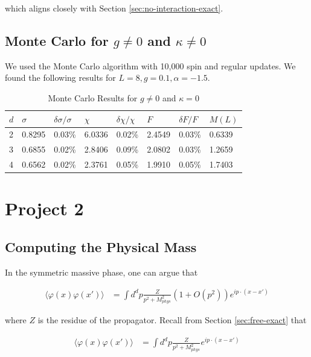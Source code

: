 \documentclass[12]{report}
\newcommand\0{\mathbf{0}}
\newcommand\<{\langle}
\renewcommand\>{\rangle}
\renewcommand\phi{\varphi}
\begin{document}
which aligns closely with Section \ref{sec:no-interaction-exact}.

\section{Monte Carlo for $g\neq0$ and $\kappa \neq 0$}


We used the Monte Carlo algorithm with 10,000 spin and regular updates. We found the following results for $L = 8, g = 0.1, \alpha = -1.5$.

\begin{table}[H]
\centering
\begin{tabular}{|l|l|l|l|l|l|l|l|}
\hline
$d$ & $\sigma$ & $\delta \sigma / \sigma$ & $\chi$ & $\delta \chi / \chi$ & $F$ & $ \delta F / F$ & $M(L)$ \\ \hline
2   & 0.8295 & 0.03\% & 6.0336 & 0.02\%& 2.4549 & 0.03\% & 0.6339 \\
3   & 0.6855 & 0.02\%& 2.8406 & 0.09\% & 2.0802 & 0.03\% & 1.2659  \\
4   & 0.6562 &  0.02\% & 2.3761 & 0.05\% & 1.9910 &  0.05\% & 1.7403 \\ \hline
\end{tabular}
\caption{Monte Carlo Results for $g\neq 0$ and $\kappa = 0$}
\end{table}


\chapter{Project 2}

\section{Computing the Physical Mass}

In the symmetric massive phase, one can argue that 


\begin{align*}
\< \phi(x) \phi(x') \> &= \int d^dp \frac{Z}{p^2 + M^2_{phys}} (1 + O(p^2)) e^{ip \cdot (x-x')}	
\end{align*}

where $Z$ is the residue of the propagator. Recall from Section \ref{sec:free-exact} that

\begin{align*}
\< \phi(x) \phi(x') \> &= \int d^dp \frac{Z}{p^2 + M^2_{phys}} e^{ip \cdot (x-x')}	
\end{align*}
\end{document}
